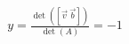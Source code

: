 \documentclass[preview]{standalone}
\begin{document}
\begin{align*}
y=\frac{\det([\vec{v}\ \vec{b}])}{\det(A)}=-1
\end{align*}
\end{document}
